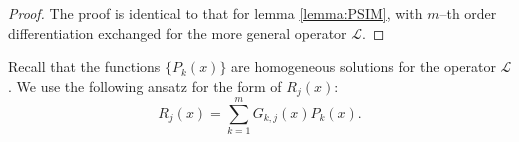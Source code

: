 \documentclass{book}
\begin{document}
\begin{proof}
The proof is identical to that for lemma \ref{lemma:PSIM}, with $m$--th order differentiation exchanged for the more general operator $\mathcal{L}$.
\end{proof}


Recall that the functions $\{ P_k(x) \}$ are homogeneous solutions for the operator $\mathcal{L}$.
We use the following ansatz for the form of $R_j(x)$:
\begin{equation} \label{ansatz}
R_j(x) = \sum_{k=1}^m G_{k,j}(x) P_k(x) .
\end{equation}
\end{document}
